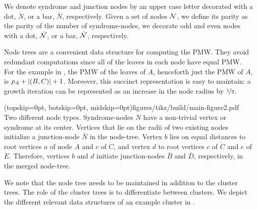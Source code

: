 We denote syndrome and junction nodes by an upper case letter decorated with a dot, $\dot{N}$, or a bar, $\bar{N}$, respectively. Given a set of nodes $\mathcal{N}$, we define its parity as the parity of the number of syndrome-nodes, we decorate odd and even nodes with a dot, $\dot{\mathcal{N}}$, or a bar, $\bar{\mathcal{N}}$, respectively.


Node trees are a convenient data structure for computing the PMW. %
They avoid redundant computations since all of the leaves in each node have equal PMW. For the example in , the PMW of the leaves of $A$, henceforth just the PMW of $A$, is $\rho_A + \lvert(B,C)\rvert +1$. Moreover, this succinct representation is easy to maintain: a growth iteration can be represented as an increase in the node radius by $\nicefrac{1}{2}$.

\Figure[bt](topskip=0pt, botskip=0pt, midskip=0pt){figures/tikz/build/main-figure2.pdf}{
Two different node types. Syndrome-nodes $N$ have a non-trivial vertex or syndrome at its center. Vertices that lie on the radii of two existing nodes initialize a junction-node $\bar{N}$ in the node-tree. Vertex $b$ lies on equal distances to root vertices $a$ of node $\dot{A}$ and $c$ of $\dot{C}$, and vertex $d$ to root vertices $c$ of $\dot{C}$ and $e$ of $\dot{E}$. Therefore, vertices $b$ and $d$ initiate junction-nodes $\bar{B}$ and $\bar{D}$, respectively, in the merged node-tree. \label{fig:nodes}}

We note that the node tree needs to be maintained in addition to the cluster trees. The role of the cluster trees is to differentiate between clusters.
We depict the different relevant data structures %
of an example cluster in . %

